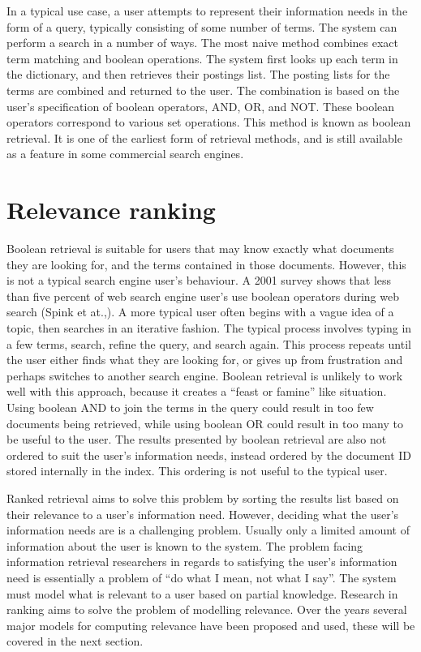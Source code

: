 In a typical use case, a user attempts to represent their information needs in the form of a query, typically consisting of some number of terms. The system can perform a search in a number of ways. The most naive method combines exact term matching and boolean operations. The system first looks up each term in the dictionary, and then retrieves their postings list. The posting lists for the terms are combined and returned to the user. The combination is based on the user's specification of boolean operators, AND, OR, and NOT. These boolean operators correspond to various set operations. This method is known as boolean retrieval. It is one of the earliest form of retrieval methods, and is still available as a feature in some commercial search engines. 

\section{Relevance ranking}

Boolean retrieval is suitable for users that may know exactly what documents they are looking for, and the terms contained in those documents. However, this is not a typical search engine user's behaviour. A 2001 survey shows that less than five percent of web search engine user's use boolean operators during web search (Spink et at.,)\cite{spink2001searching}. A more typical user often begins with a vague idea of a topic, then searches in an iterative fashion. The typical process involves typing in a few terms, search, refine the query, and search again. This process repeats until the user either finds what they are looking for, or gives up from frustration and perhaps switches to another search engine. Boolean retrieval is unlikely to work well with this approach, because it creates a “feast or famine” like situation. Using boolean AND to join the terms in the query could result in too few documents being retrieved, while using boolean OR could result in too many to be useful to the user. The results presented by boolean retrieval are also not ordered to suit the user's information needs, instead ordered by the document ID stored internally in the index. This ordering is not useful to the typical user.

Ranked retrieval aims to solve this problem by sorting the results list based on their relevance to a user’s information need. However, deciding what the user's information needs are is a challenging problem. Usually only a limited amount of information about the user is known to the system. The problem facing information retrieval researchers in regards to satisfying the user's information need is essentially a problem of ``do what I mean, not what I say''. The system must model what is relevant to a user based on partial knowledge. Research in ranking aims to solve the problem of modelling relevance. Over the years several major models for computing relevance have been proposed and used, these will be covered in the next section.


